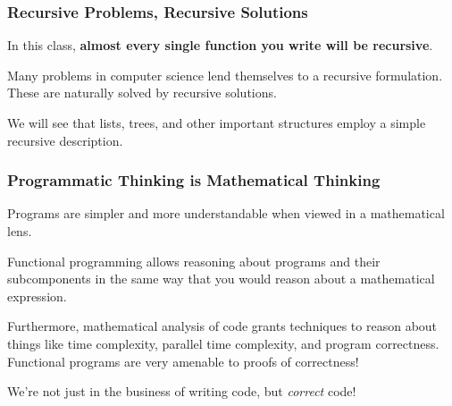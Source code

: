 \documentclass[aspectratio=169]{beamer}
\begin{document}
\begin{frame}[fragile]
  \frametitle{Recursive Problems, Recursive Solutions}

  In this class, \textbf{almost every single function you write will be recursive}.

  \pause
  \vspace{\fill}

  Many problems in computer science lend themselves to a recursive formulation. These
  are naturally solved by recursive solutions.

  \pause
  \vspace{\fill}

  We will see that lists, trees, and other important structures employ a simple 
  recursive description.

\end{frame}

\begin{frame}[fragile]
  \frametitle{Programmatic Thinking is Mathematical Thinking}

  Programs are simpler and more understandable when viewed in a mathematical lens.
  
  \pause
  \vspace{\fill}

  Functional programming allows reasoning about programs and their subcomponents
  in the same way that you would reason about a mathematical expression. 

  \pause
  \vspace{\fill}

  Furthermore, mathematical analysis of code grants techniques to reason about 
  things like time complexity, parallel time complexity, and program correctness.
  Functional programs are very amenable to proofs of correctness! 

  \pause
  \vspace{\fill}

  We're not just in the business of writing code, but \textit{correct} code!

\end{frame}
\end{document}
